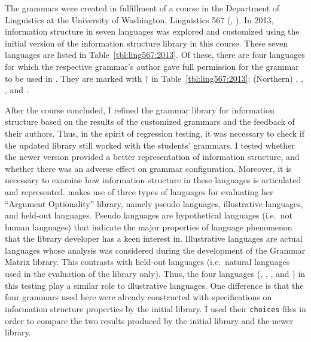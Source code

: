 The grammars were created in fulfillment of a 
course in the Department of Linguistics at the University of
Washington, Linguistics 567
(, \citealt{bender:07}).
In 2013, information structure in seven languages was explored and
customized using the initial version of the information structure
library in this course.  These seven languages are listed in
Table~\ref{tbl:ling567:2013}.  Of these, there are four languages for
which the respective grammar's author gave full permission for the
grammar to be used in .  They are marked with
\ensuremath{\dagger} in Table~\ref{tbl:ling567:2013}: (Northern)
, , , and .


After the course concluded, I refined the grammar library for
information structure based on the results of the customized grammars
and the feedback of their authors.  Thus, in the spirit of regression
testing, it was necessary to check if the updated library still worked
with the students' grammars. I tested whether the
newer version provided a better representation of information
structure, and whether there was an adverse effect on grammar
configuration. Moreover, it is necessary to examine how information
structure in these languages is articulated and represented.
\citet{saleem:10} makes use of three types of languages for evaluating
her ``Argument Optionality'' library, namely pseudo languages,
illustrative languages, and held-out languages.
Pseudo languages are hypothetical languages 
(i.e.\ not human languages) that indicate the
major properties of language phenomenon that the library developer has
a keen interest in.  Illustrative languages are actual languages whose
analysis was considered during the development of the Grammar Matrix
library.  This contrasts with held-out languages (i.e.\ natural
languages used in the evaluation of the library only).  Thus, the four
languages (, , , and
) in this testing play a similar role to illustrative
languages.  One difference is that the four grammars used here were
already constructed with specifications on information structure
properties by the initial library.  I used their \texttt{choices}
files in order to compare the two results produced by the initial
library and the newer library.







